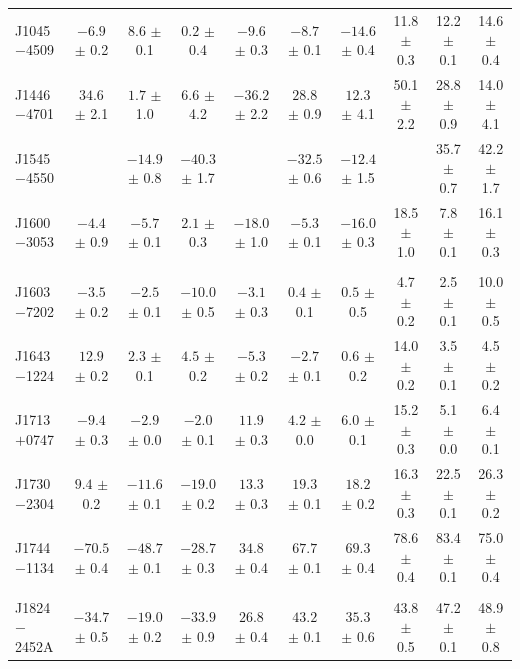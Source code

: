 \documentclass[useAMS,usenatbib]{mn2e}
\begin{document}
\begin{table}
\begin{center}
\begin{tabular}{lccccccccc}
J1045$-$4509 &$-6.9 $ $\pm$ 0.2 & $8.6  $ $\pm$ 0.1 & $0.2  $ $\pm$ 0.4 & $-9.6 $ $\pm$ 0.3 & $-8.7 $ $\pm$ 0.1 & $-14.6$ $\pm$ 0.4 & 11.8 $\pm$ 0.3 & 12.2 $\pm$ 0.1 & 14.6 $\pm$ 0.4 \\
J1446$-$4701 &$34.6 $ $\pm$ 2.1 & $1.7  $ $\pm$ 1.0 & $6.6  $ $\pm$ 4.2 & $-36.2$ $\pm$ 2.2 & $28.8 $ $\pm$ 0.9 & $12.3 $ $\pm$ 4.1 & 50.1 $\pm$ 2.2 & 28.8 $\pm$ 0.9 & 14.0 $\pm$ 4.1 \\
J1545$-$4550 &                  & $-14.9$ $\pm$ 0.8 & $-40.3$ $\pm$ 1.7 &                   & $-32.5$ $\pm$ 0.6 & $-12.4$ $\pm$ 1.5 &                & 35.7 $\pm$ 0.7 & 42.2 $\pm$ 1.7 \\
J1600$-$3053 &$-4.4 $ $\pm$ 0.9 & $-5.7 $ $\pm$ 0.1 & $2.1  $ $\pm$ 0.3 & $-18.0$ $\pm$ 1.0 & $-5.3 $ $\pm$ 0.1 & $-16.0$ $\pm$ 0.3 & 18.5 $\pm$ 1.0 & 7.8  $\pm$ 0.1 & 16.1 $\pm$ 0.3 \\
             &                &                 &                &                   &                   &                   &                &                &                 \\
J1603$-$7202 &$-3.5 $ $\pm$ 0.2 & $-2.5 $ $\pm$ 0.1 & $-10.0$ $\pm$ 0.5 & $-3.1 $ $\pm$ 0.3 & $0.4  $ $\pm$ 0.1 & $0.5  $ $\pm$ 0.5 & 4.7  $\pm$ 0.2 & 2.5  $\pm$ 0.1 & 10.0 $\pm$ 0.5 \\
J1643$-$1224 &$12.9 $ $\pm$ 0.2 & $2.3  $ $\pm$ 0.1 & $4.5  $ $\pm$ 0.2 & $-5.3 $ $\pm$ 0.2 & $-2.7 $ $\pm$ 0.1 & $0.6  $ $\pm$ 0.2 & 14.0 $\pm$ 0.2 & 3.5  $\pm$ 0.1 & 4.5  $\pm$ 0.2 \\
J1713$+$0747 &$-9.4 $ $\pm$ 0.3 & $-2.9 $ $\pm$ 0.0 & $-2.0 $ $\pm$ 0.1 & $11.9 $ $\pm$ 0.3 & $4.2  $ $\pm$ 0.0 & $6.0  $ $\pm$ 0.1 & 15.2 $\pm$ 0.3 & 5.1  $\pm$ 0.0 & 6.4  $\pm$ 0.1 \\
J1730$-$2304 &$9.4  $ $\pm$ 0.2 & $-11.6$ $\pm$ 0.1 & $-19.0$ $\pm$ 0.2 & $13.3 $ $\pm$ 0.3 & $19.3 $ $\pm$ 0.1 & $18.2 $ $\pm$ 0.2 & 16.3 $\pm$ 0.3 & 22.5 $\pm$ 0.1 & 26.3 $\pm$ 0.2 \\
J1744$-$1134 &$-70.5$ $\pm$ 0.4 & $-48.7$ $\pm$ 0.1 & $-28.7$ $\pm$ 0.3 & $34.8 $ $\pm$ 0.4 & $67.7 $ $\pm$ 0.1 & $69.3 $ $\pm$ 0.4 & 78.6 $\pm$ 0.4 & 83.4 $\pm$ 0.1 & 75.0 $\pm$ 0.4 \\
             &                &                 &                &                   &                   &                   &                &                &                 \\
J1824$-$2452A&$-34.7$ $\pm$ 0.5 & $-19.0$ $\pm$ 0.2 & $-33.9$ $\pm$ 0.9 & $26.8 $ $\pm$ 0.4 & $43.2 $ $\pm$ 0.1 & $35.3 $ $\pm$ 0.6 & 43.8 $\pm$ 0.5 & 47.2 $\pm$ 0.1 & 48.9 $\pm$ 0.8 \\

\end{tabular}
\end{center}
\end{table}
\end{document}

